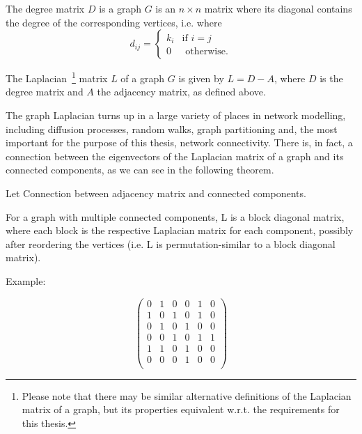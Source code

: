 \begin{definition}The degree matrix $D$ is a graph $G$ is an $n\times n $ matrix where its diagonal contains the degree of the corresponding vertices, i.e. where $$d_{ij} = \begin{cases}
    k_i & \text{if } i = j \\
	0 & \text{ otherwise.} 
\end{cases}$$
\end{definition}

\begin{definition}The Laplacian~\footnote{Please note that there may be similar alternative definitions of the Laplacian matrix of a graph, but its properties equivalent w.r.t. the requirements for this thesis.}  matrix $L$ of a graph $G$ is given by $L = D - A$, where $D$ is the degree matrix and $A$ the adjacency matrix, as defined above.
\end{definition}

\begin{remark}The graph Laplacian turns up in a large variety of places in network modelling, including diffusion processes, random walks, graph partitioning and, the most important for the purpose of this thesis, network connectivity.
There is, in fact, a connection between the eigenvectors of the Laplacian matrix of a graph and its connected components, as we can see in the following theorem.\end{remark}

\begin{theorem}Let Connection between adjacency matrix and connected components.\end{theorem}

For a graph with multiple connected components, L is a block diagonal matrix, where each block is the respective Laplacian matrix for each component, possibly after reordering the vertices (i.e. L is permutation-similar to a block diagonal matrix).


Example:

$${\begin{pmatrix}0&1&0&0&1&0\\1&0&1&0&1&0\\0&1&0&1&0&0\\0&0&1&0&1&1\\1&1&0&1&0&0\\0&0&0&1&0&0\\\end{pmatrix}}$$






